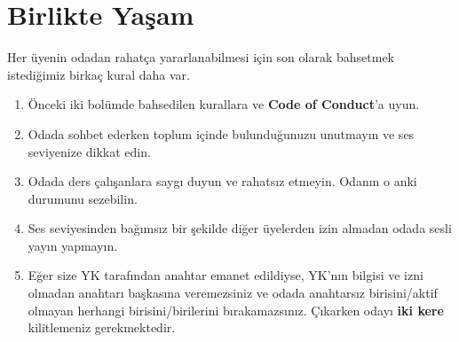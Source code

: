 \documentclass{article}
\begin{document}
\section{Birlikte Yaşam}
\hspace{5mm} Her üyenin odadan rahatça yararlanabilmesi için son olarak bahsetmek istediğimiz birkaç kural daha var.
\begin{enumerate}
    \item 	Önceki iki bolümde bahsedilen kurallara ve \textbf{Code of Conduct}’a uyun.
    \item Odada sohbet ederken toplum içinde bulunduğunuzu unutmayın ve ses seviyenize dikkat edin.
    \item Odada ders çalışanlara saygı duyun ve rahatsız etmeyin. Odanın o anki durumunu sezebilin.
    \item Ses seviyesinden bağımsız bir şekilde diğer üyelerden izin almadan odada sesli yayın yapmayın.
    \item Eğer size YK tarafından anahtar emanet edildiyse, YK'nın bilgisi ve izni olmadan anahtarı başkasına veremezsiniz ve odada anahtarsız birisini/aktif olmayan herhangi birisini/birilerini bırakamazsınız. Çıkarken odayı \textbf{iki kere} kilitlemeniz gerekmektedir. 
\end{enumerate}
\end{document}
